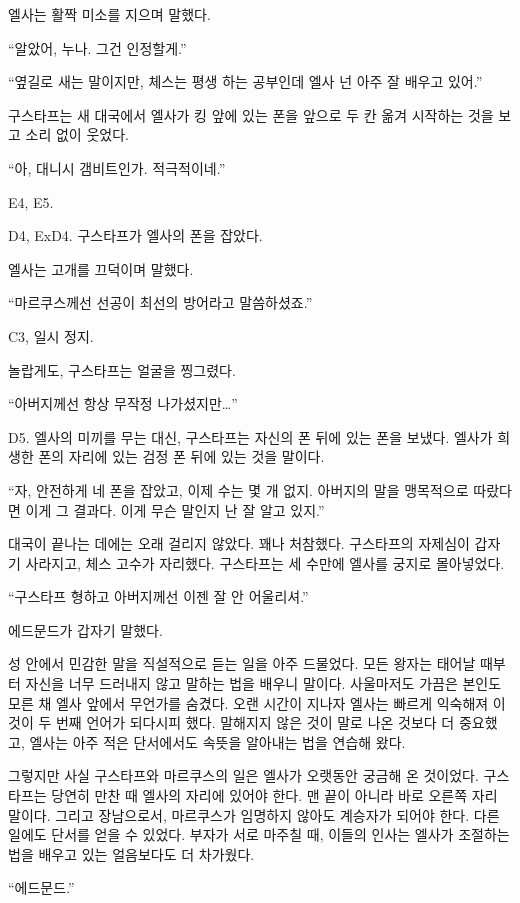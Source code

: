 엘사는 활짝 미소를 지으며 말했다.

``알았어, 누나. 그건 인정할게.''

``옆길로 새는 말이지만, 체스는 평생 하는 공부인데 엘사 넌 아주 잘 배우고 있어.''

구스타프는 새 대국에서 엘사가 킹 앞에 있는 폰을 앞으로 두 칸 옮겨 시작하는 것을 보고 소리 없이 웃었다.

``아, 대니시 갬비트인가. 적극적이네.''

E4, E5.

D4, ExD4. 구스타프가 엘사의 폰을 잡았다.

엘사는 고개를 끄덕이며 말했다.

``마르쿠스께선 선공이 최선의 방어라고 말씀하셨죠.''

C3, 일시 정지.

놀랍게도, 구스타프는 얼굴을 찡그렸다.

``아버지께선 항상 무작정 나가셨지만\ldots''

D5. 엘사의 미끼를 무는 대신, 구스타프는 자신의 폰 뒤에 있는 폰을 보냈다. 엘사가 희생한 폰의 자리에 있는 검정 폰 뒤에 있는 것을 말이다.

``자, 안전하게 네 폰을 잡았고, 이제 수는 몇 개 없지. 아버지의 말을 맹목적으로 따랐다면 이게 그 결과다. 이게 무슨 말인지 난 잘 알고 있지.''

대국이 끝나는 데에는 오래 걸리지 않았다. 꽤나 처참했다. 구스타프의 자제심이 갑자기 사라지고, 체스 고수가 자리했다. 구스타프는 세 수만에 엘사를 궁지로 몰아넣었다.

``구스타프 형하고 아버지께선 이젠 잘 안 어울리셔.''

에드문드가 갑자기 말했다.

성 안에서 민감한 말을 직설적으로 듣는 일을 아주 드물었다. 모든 왕자는 태어날 때부터 자신을 너무 드러내지 않고 말하는 법을 배우니 말이다. 사울마저도 가끔은 본인도 모른 채 엘사 앞에서 무언가를 숨겼다. 오랜 시간이 지나자 엘사는 빠르게 익숙해져 이것이 두 번째 언어가 되다시피 했다. 말해지지 않은 것이 말로 나온 것보다 더 중요했고, 엘사는 아주 적은 단서에서도 속뜻을 알아내는 법을 연습해 왔다.

그렇지만 사실 구스타프와 마르쿠스의 일은 엘사가 오랫동안 궁금해 온 것이었다. 구스타프는 당연히 만찬 때 엘사의 자리에 있어야 한다. 맨 끝이 아니라 바로 오른쪽 자리 말이다. 그리고 장남으로서, 마르쿠스가 임명하지 않아도 계승자가 되어야 한다. 다른 일에도 단서를 얻을 수 있었다. 부자가 서로 마주칠 때, 이들의 인사는 엘사가 조절하는 법을 배우고 있는 얼음보다도 더 차가웠다.

``에드문드.''

